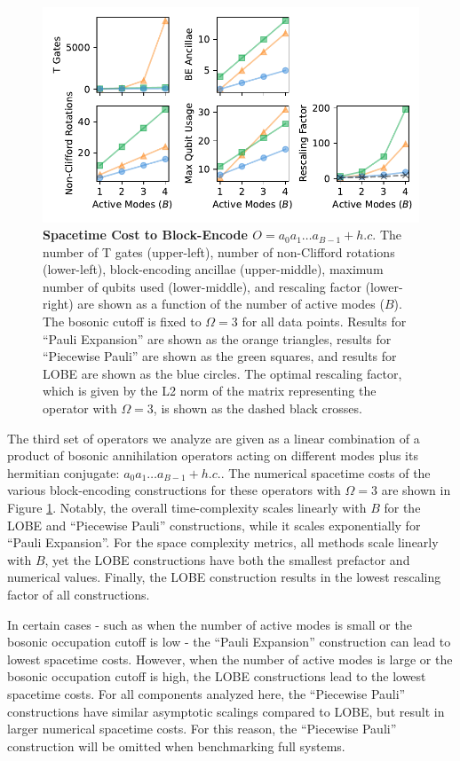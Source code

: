 \begin{figure}
    \centering
    \includegraphics[width=14cm]{figures/bosonic-hc-comparison.pdf}
    \caption{
        \textbf{Spacetime Cost to Block-Encode $O = a_0 a_1 \hdots a_{B-1} + h.c.$}
        The number of T gates (upper-left), number of non-Clifford rotations (lower-left), block-encoding ancillae (upper-middle), maximum number of qubits used (lower-middle), and rescaling factor (lower-right) are shown as a function of the number of active modes ($B$).
        The bosonic cutoff is fixed to $\Omega = 3$ for all data points.
        Results for ``Pauli Expansion'' are shown as the orange triangles, results for ``Piecewise Pauli'' are shown as the green squares, and results for LOBE are shown as the blue circles.
        The optimal rescaling factor, which is given by the L2 norm of the matrix representing the operator with $\Omega = 3$, is shown as the dashed black crosses.
    }
    \label{fig:bosonic-hc-comparison}
\end{figure}

The third set of operators we analyze are given as a linear combination of a product of bosonic annihilation operators acting on different modes plus its hermitian conjugate: $a_0 a_1 \hdots a_{B-1} + h.c.$.
The numerical spacetime costs of the various block-encoding constructions for these operators with $\Omega = 3$ are shown in Figure \ref{fig:bosonic-hc-comparison}.
Notably, the overall time-complexity scales linearly with $B$ for the LOBE and ``Piecewise Pauli'' constructions, while it scales exponentially for ``Pauli Expansion''.
For the space complexity metrics, all methods scale linearly with $B$, yet the LOBE constructions have both the smallest prefactor and numerical values.
Finally, the LOBE construction results in the lowest rescaling factor of all constructions.

In certain cases - such as when the number of active modes is small or the bosonic occupation cutoff is low - the ``Pauli Expansion'' construction can lead to lowest spacetime costs.
However, when the number of active modes is large or the bosonic occupation cutoff is high, the LOBE constructions lead to the lowest spacetime costs.
For all components analyzed here, the ``Piecewise Pauli'' constructions have similar asymptotic scalings compared to LOBE, but result in larger numerical spacetime costs.
For this reason, the ``Piecewise Pauli'' construction will be omitted when benchmarking full systems.
